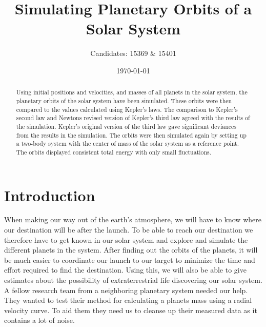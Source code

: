 \documentclass[reprint,english,notitlepage]{revtex4-2}
\begin{document}
\title{Simulating Planetary Orbits of a Solar System}
\author{Candidates: 15369 \& 15401}
\date{\today}

\begin{abstract}
	Using initial positions and velocities, and masses of all planets in the solar system, the planetary orbits of the solar system have been simulated.
	These orbits were then compared to the values calculated using Kepler's laws.
	The comparison to Kepler's second law and Newtons revised version of Kepler's third law agreed with the results of the simulation.
	Kepler's original version of the third law gave significant deviances from the results in the simulation.
	The orbits were then simulated again by setting up a two-body system with the center of mass of the solar system as a reference point.
	The orbits displayed consistent total energy with only small fluctuations.
\end{abstract}
\maketitle

\section{Introduction}
When making our way out of the earth's atmosphere, we will have to know where our destination will be after the launch.
To be able to reach our destination we therefore have to get known in our solar system and explore and simulate the different planets in the system.
After finding out the orbits of the planets, it will be much easier to coordinate our launch to our target to minimize the time and effort required to find the destination.
Using this, we will also be able to give estimates about the possibility of extraterrestrial life discovering our solar system. A fellow research team from a neighboring planetary system needed our help. They wanted to test their method for calculating a planets mass using a radial velocity curve. To aid them they need us to cleanse up their measured data as it contains a lot of noise. 
\end{document}
